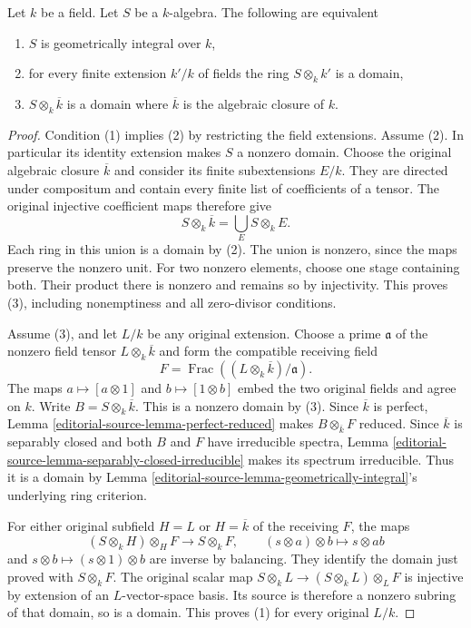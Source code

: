 \begin{lemma}
\label{editorial-source-lemma-characterize-geometrically-integral}
Let $k$ be a field. Let $S$ be a $k$-algebra.
The following are equivalent
\begin{enumerate}
\item $S$ is geometrically integral over $k$,
\item for every finite extension $k'/k$ of fields
the ring $S \otimes_k k'$ is a domain,
\item $S \otimes_k \overline{k}$ is a domain
where $\overline{k}$ is the algebraic closure of $k$.
\end{enumerate}
\end{lemma}

\begin{proof}
Condition (1) implies (2) by
restricting the field extensions.
Assume (2). In particular its
identity extension makes $S$
a nonzero domain. Choose the
original algebraic closure
$\overline k$ and consider its
finite subextensions $E/k$.
They are directed under compositum
and contain every finite list
of coefficients of a tensor.
The original injective coefficient
maps therefore give
$$
S\otimes_k\overline k=\bigcup_E S\otimes_k E.
$$
Each ring in this union is a
domain by (2). The union is
nonzero, since the maps preserve
the nonzero unit. For two
nonzero elements, choose one
stage containing both. Their
product there is nonzero and
remains so by injectivity.
This proves (3), including
nonemptiness and all zero-divisor
conditions.

Assume (3), and let $L/k$
be any original extension.
Choose a prime $\mathfrak a$
of the nonzero field tensor
$L\otimes_k\overline k$ and
form the compatible receiving
field
$$
F=\operatorname{Frac}((L\otimes_k\overline k)/\mathfrak a).
$$
The maps $a\mapsto[a\otimes1]$
and $b\mapsto[1\otimes b]$
embed the two original fields
and agree on $k$. Write
$B=S\otimes_k\overline k$.
This is a nonzero domain
by (3). Since $\overline k$
is perfect, Lemma
\ref{editorial-source-lemma-perfect-reduced}
makes $B\otimes_{\overline k}F$
reduced. Since $\overline k$
is separably closed and both
$B$ and $F$ have irreducible
spectra, Lemma
\ref{editorial-source-lemma-separably-closed-irreducible}
makes its spectrum irreducible.
Thus it is a domain by Lemma
\ref{editorial-source-lemma-geometrically-integral}'s
underlying ring criterion.

For either original subfield
$H=L$ or $H=\overline k$ of
the receiving $F$, the maps
$$
(S\otimes_k H)\otimes_H F\longrightarrow S\otimes_k F,
\qquad(s\otimes a)\otimes b\longmapsto s\otimes ab
$$
and $s\otimes b\mapsto(s\otimes1)\otimes b$
are inverse by balancing.
They identify the domain just
proved with $S\otimes_k F$.
The original scalar map
$S\otimes_k L\to(S\otimes_k L)\otimes_L F$
is injective by extension of
an $L$-vector-space basis.
Its source is therefore a
nonzero subring of that domain,
so is a domain. This proves
(1) for every original $L/k$.


\end{proof}

